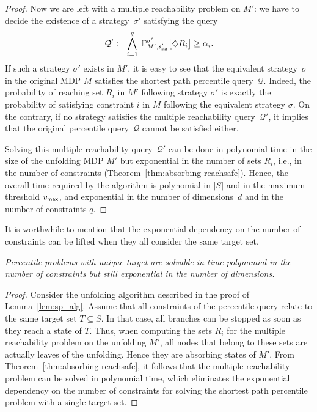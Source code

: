 \documentclass{llncs}
\newcommand{\states}{\ensuremath{S} }
\newcommand{\initState}{\ensuremath{s_{{\sf init}}} }
\newcommand{\markovProcess}{\ensuremath{{M} }}
\newcommand{\strat}{\ensuremath{\sigma} }
\newcommand*{\pr}{\mathbb{P}}
\newcommand{\truncatedTarget}{\ensuremath{T} }
\newcommand{\dimension}{\ensuremath{d} }
\newcommand{\queries}{\ensuremath{q} }
\newcommand{\query}{\ensuremath{\mathcal{Q}} }
\begin{document}
\begin{proof}
Now we are left with a multiple reachability problem on $M'$: we have to decide the existence of a strategy~$\strat'$ satisfying the query
\begin{equation*}
\query' \coloneqq \bigwedge_{i = 1}^{q}\; \pr_{M',\initState'}^{\strat'}\big[\diamondsuit R_{i}\big] \geq
	\alpha_i.
\end{equation*}
If such a strategy $\strat'$ exists in $\markovProcess'$, it is easy to see that the equivalent strategy~$\strat$ in the original MDP $\markovProcess$ satisfies the shortest path percentile query~$\query$. Indeed, the probability of reaching set $R_{i}$ in $M'$ following strategy $\strat'$ is exactly the probability of satisfying constraint $i$ in $M$ following the equivalent strategy $\strat$. On the contrary, if no strategy satisfies the multiple reachability query~$\query'$, it implies that the original percentile query~$\query$ cannot be satisfied either.

Solving this multiple reachability query~$\query'$ can be done in polynomial time in the size of the unfolding MDP $\markovProcess'$ but exponential in the number of sets $R_{i}$, i.e., in the number of constraints (Theorem~\ref{thm:absorbing-reachsafe}). Hence, the overall time required by the algorithm is polynomial in $\vert\states\vert$ and in the maximum threshold $v_{{\sf max}}$, and exponential in the number of dimensions~$\dimension$ and in the number of constraints $\queries$.
\end{proof}


It is worthwhile to mention that the exponential dependency on the number of constraints can be lifted when they all consider the same target set.

\begin{remark}
\textit{Percentile problems with unique target are solvable in time polynomial in the number of constraints but still exponential in the number of dimensions.}
\end{remark}

\begin{proof}
Consider the unfolding algorithm described in the proof of Lemma~\ref{lem:sp_alg}. Assume that all constraints of the percentile query relate to the same target set $\truncatedTarget \subseteq \states$. In that case, all branches can be stopped as soon as they reach a state of $\truncatedTarget$. Thus, when computing the sets $R_{i}$ for the multiple reachability problem on the unfolding $\markovProcess'$, all nodes that belong to these sets are actually leaves of the unfolding. Hence they are absorbing states of $\markovProcess'$. From Theorem~\ref{thm:absorbing-reachsafe}, it follows that the multiple reachability problem can be solved in polynomial time, which eliminates the exponential dependency on the number of constraints for solving the shortest path percentile problem with a single target set.
\end{proof}
\end{document}
